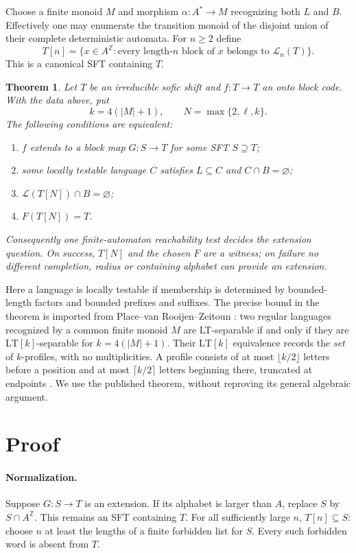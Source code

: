 \documentclass[11pt]{article}
\newtheorem{theorem}{Theorem}
\newcommand{\Lang}{\mathcal L}
\newcommand{\LT}{\mathrm{LT}}
\newcommand{\ZZ}{\mathbb Z}
\begin{document}
Choose a finite monoid $M$ and morphism $\alpha:A^*\to M$ recognizing
both $L$ and $B$. Effectively one may enumerate the transition monoid
of the disjoint union of their complete deterministic automata.
For $n\ge2$ define
\[
 T[n]=\{x\in A^{\ZZ}:\text{every length-}n\text{ block of }x
                 \text{ belongs to }\Lang_n(T)\}.
\]
This is a canonical SFT containing $T$.

\begin{theorem}\label{main}
Let $T$ be an irreducible sofic shift and $f:T\to T$ an onto block code.
With the data above, put
\[
 k=4(|M|+1),\qquad N=\max\{2,\ell,k\}.
\]
The following conditions are equivalent:
\begin{enumerate}
\item $f$ extends to a block map $G:S\to T$ for some SFT $S\supseteq T$;
\item some locally testable language $C$ satisfies
      $L\subseteq C$ and $C\cap B=\varnothing$;
\item $\Lang(T[N])\cap B=\varnothing$;
\item $F(T[N])=T$.
\end{enumerate}
Consequently one finite-automaton reachability test decides the
extension question. On success, $T[N]$ and the chosen $F$ are a witness;
on failure no different completion, radius or containing alphabet
can provide an extension.
\end{theorem}

Here a language is locally testable if membership is determined by
bounded-length factors and bounded prefixes and suffixes. The precise
bound in the theorem is imported from
Place--van Rooijen--Zeitoun \cite[Theorem 4.2]{PRZ}:
two regular languages recognized by a common finite monoid $M$ are
LT-separable if and only if they are $\LT[k]$-separable for
$k=4(|M|+1)$. Their $\LT[k]$ equivalence records the \emph{set} of
$k$-profiles, with no multiplicities. A profile consists of at most
$\lfloor k/2\rfloor$ letters before a position and at most
$\lceil k/2\rceil$ letters beginning there, truncated at endpoints
\cite[Sections 2--4]{PRZ}. We use the published theorem, without
reproving its general algebraic argument.

\section{Proof}
\paragraph{Normalization.}
Suppose $G:S\to T$ is an extension. If its alphabet is larger than $A$,
replace $S$ by $S\cap A^{\ZZ}$. This remains an SFT containing $T$.
For all sufficiently large $n$, $T[n]\subseteq S$: choose $n$ at least
the lengths of a finite forbidden list for $S$. Every such forbidden
word is absent from $T$.
\end{document}
